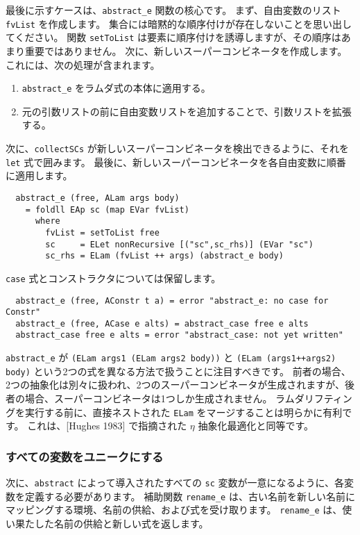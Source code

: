 \documentclass{jarticle}
\begin{document}
最後に示すケースは、\texttt{abstract\_e} 関数の核心です。
まず、自由変数のリスト \texttt{fvList} を作成します。
集合には暗黙的な順序付けが存在しないことを思い出してください。
関数 \texttt{setToList} は要素に順序付けを誘導しますが、その順序はあまり重要ではありません。
次に、新しいスーパーコンビネータを作成します。
これには、次の処理が含まれます。

\begin{enumerate}
	\item \texttt{abstract\_e} をラムダ式の本体に適用する。
	\item 元の引数リストの前に自由変数リストを追加することで、引数リストを拡張する。
\end{enumerate}

次に、\texttt{collectSCs} が新しいスーパーコンビネータを検出できるように、それを \texttt{let} 式で囲みます。
最後に、新しいスーパーコンビネータを各自由変数に順番に適用します。

\begin{verbatim}
  abstract_e (free, ALam args body)
    = foldll EAp sc (map EVar fvList)
      where
        fvList = setToList free
        sc     = ELet nonRecursive [("sc",sc_rhs)] (EVar "sc")
        sc_rhs = ELam (fvList ++ args) (abstract_e body)
\end{verbatim}

\texttt{case} 式とコンストラクタについては保留します。

\begin{verbatim}
  abstract_e (free, AConstr t a) = error "abstract_e: no case for Constr"
  abstract_e (free, ACase e alts) = abstract_case free e alts
  abstract_case free e alts = error "abstract_case: not yet written"
\end{verbatim}

\texttt{abstract\_e} が \texttt{(ELam args1 (ELam args2 body))} と \texttt{(ELam (args1++args2) body)} という2つの式を異なる方法で扱うことに注目すべきです。
前者の場合、2つの抽象化は別々に扱われ、2つのスーパーコンビネータが生成されますが、後者の場合、スーパーコンビネータは1つしか生成されません。
ラムダリフティングを実行する前に、直接ネストされた \texttt{ELam} をマージすることは明らかに有利です。
これは、[Hughes 1983] で指摘された $\eta$ 抽象化最適化と同等です。

\subsubsection{すべての変数をユニークにする}

次に、\texttt{abstract} によって導入されたすべての \texttt{sc} 変数が一意になるように、各変数を定義する必要があります。
補助関数 \texttt{rename\_e} は、古い名前を新しい名前にマッピングする環境、名前の供給、および式を受け取ります。
\texttt{rename\_e} は、使い果たした名前の供給と新しい式を返します。
\end{document}
